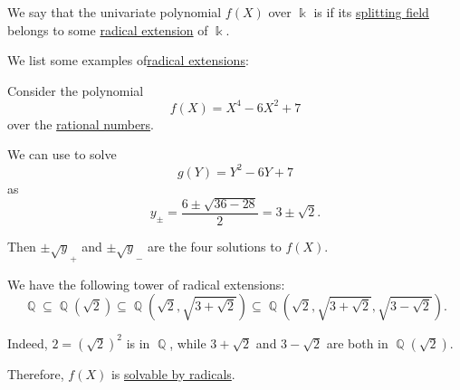 \begin{definition}\label{def:polynomial_solvable_by_radicals}
  We say that the univariate polynomial \( f(X) \) over \( \Bbbk \) is  if its \hyperref[def:splitting_field]{splitting field} belongs to some \hyperref[def:radical_extension]{radical extension} of \( \Bbbk \).
\end{definition}

\begin{example}\label{ex:def:radical_extension}
  We list some examples of\hyperref[def:radical_extension]{radical extensions}:
  \begin{thmenum}
     Consider the polynomial
    \begin{equation*}
      f(X) = X^4 - 6X^2 + 7
    \end{equation*}
    over the \hyperref[def:rational_numbers]{rational numbers}.

    We can use  to solve
    \begin{equation*}
      g(Y) = Y^2 - 6Y + 7
    \end{equation*}
    as
    \begin{equation*}
      y_\pm = \frac {6 \pm \sqrt{ 36 - 28 }} 2 = 3 \pm \sqrt 2.
    \end{equation*}

    Then \( \pm \sqrt y_+ \) and \( \pm \sqrt y_- \) are the four solutions to \( f(X) \).

    We have the following tower of radical extensions:
    \begin{equation*}
      \BbbQ \subseteq \BbbQ(\sqrt 2) \subseteq \BbbQ(\sqrt 2, \sqrt{3 + \sqrt 2}) \subseteq \BbbQ(\sqrt 2, \sqrt{3 + \sqrt 2}, \sqrt{3 - \sqrt 2}).
    \end{equation*}

    Indeed, \( 2 = (\sqrt 2)^2 \) is in \( \BbbQ \), while \( 3 + \sqrt 2 \) and \( 3 - \sqrt 2 \) are both in \( \BbbQ(\sqrt 2) \).

    Therefore, \( f(X) \) is \hyperref[def:polynomial_solvable_by_radicals]{solvable by radicals}.
  \end{thmenum}
\end{example}

